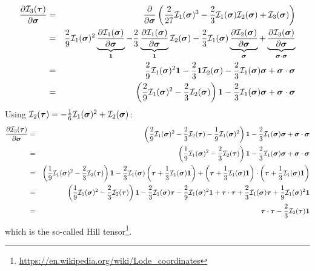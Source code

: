 \begin{eqnarray}
\frac{\partial {\cal I}_3(\bm\tau)}{\partial \bm\sigma} 
&=&
\frac{\partial }{\partial \bm\sigma} 
\left( \frac{2}{27} {\cal I}_1(\bm\sigma)^3 
- \frac{2}{3} {\cal I}_1(\bm\sigma){\cal I}_2(\bm\sigma) + {\cal I}_3(\bm\sigma) \right) \nonumber\\
&=& 
\frac{2}{9} {\cal I}_1(\bm\sigma)^2  
\underbrace{ \frac{\partial  {\cal I}_1(\bm\sigma)}{\partial \bm\sigma} }_{\bm 1} 
-\frac23 
\underbrace{ \frac{\partial {\cal I}_1(\bm\sigma)}{\partial \bm\sigma}}_{\bm 1}   {\cal I}_2(\bm\sigma) 
-\frac23 {\cal I}_1(\bm\sigma)  
\underbrace{ \frac{\partial  {\cal I}_2(\bm\sigma)}{\partial \bm\sigma} }_{\bm \sigma}
+ 
\underbrace{\frac{\partial {\cal I}_3(\bm\sigma)}{\partial \bm\sigma}}_{\bm\sigma\cdot\bm\sigma}  \nonumber\\
&=& 
\frac{2}{9} {\cal I}_1(\bm\sigma)^2 {\bm 1} 
-\frac23 {\bm 1}   {\cal I}_2(\bm\sigma) 
-\frac23 {\cal I}_1(\bm\sigma)  {\bm \sigma}
+ \bm\sigma\cdot\bm\sigma \nonumber\\
&=& \left(\frac29 {\cal I}_1(\bm\sigma)^2 - \frac23  {\cal I}_2(\bm\sigma)    \right)  {\bm 1}
-\frac23 {\cal I}_1(\bm\sigma)  {\bm \sigma}
+ \bm\sigma\cdot\bm\sigma
\end{eqnarray}
Using ${\cal I}_2(\bm\tau) = -\frac16 {\cal I}_1(\bm\sigma)^2 + {\cal I}_2(\bm\sigma)$:
\begin{eqnarray}
\frac{\partial {\cal I}_3(\bm\tau)}{\partial \bm\sigma} 
&=& \left(\frac29 {\cal I}_1(\bm\sigma)^2 - \frac23  {\cal I}_2(\bm\tau) 
-\frac19 {\cal I}_1(\bm\sigma)^2    \right)  {\bm 1}
-\frac23 {\cal I}_1(\bm\sigma)  {\bm \sigma}
+ \bm\sigma\cdot\bm\sigma \nonumber\\
&=& \left(\frac19 {\cal I}_1(\bm\sigma)^2 - \frac23  {\cal I}_2(\bm\tau) \right)  {\bm 1}
-\frac23 {\cal I}_1(\bm\sigma)  {\bm \sigma}
+ \bm\sigma\cdot\bm\sigma \nonumber\\
&=& \left(\frac19 {\cal I}_1(\bm\sigma)^2 - \frac23  {\cal I}_2(\bm\tau) \right)  {\bm 1}
-\frac23 {\cal I}_1(\bm\sigma)  \left( \bm\tau + \frac13 {\cal I}_1(\bm\sigma) {\bm 1} \right)
+ \left( \bm\tau + \frac13 {\cal I}_1(\bm\sigma) {\bm 1} \right)
\cdot \left( \bm\tau + \frac13 {\cal I}_1(\bm\sigma) {\bm 1} \right) \nonumber\\
&=& \left(\frac19 {\cal I}_1(\bm\sigma)^2 - \frac23  {\cal I}_2(\bm\tau) \right)  {\bm 1}
-\frac23 {\cal I}_1(\bm\sigma)  \bm\tau 
-\frac29 {\cal I}_1(\bm\sigma)^2   {\bm 1}
+ \bm\tau\cdot\bm\tau
+\frac23  {\cal I}_1(\bm\sigma) \bm\tau
+\frac19 {\cal I}_1(\bm\sigma)^2   {\bm 1} \nonumber\\
&=&
\bm\tau\cdot\bm\tau
-
\frac23  {\cal I}_2(\bm\tau)  {\bm 1}
\end{eqnarray}
which is the so-called Hill tensor\footnote{\url{https://en.wikipedia.org/wiki/Lode_coordinates}}.


